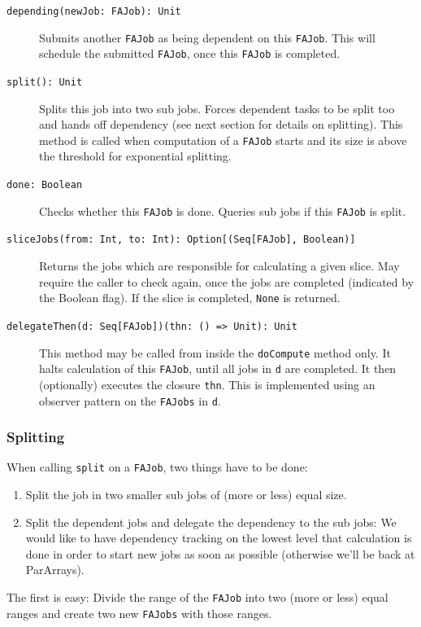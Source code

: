 \documentclass[runningheads,a4paper,fleqn]{llncs}
\begin{document}
\begin{description}
  \item[\texttt{depending(newJob: FAJob): Unit}] Submits another \texttt{FAJob} as being
    dependent on this \texttt{FAJob}. This will schedule the submitted
    \texttt{FAJob}, once this \texttt{FAJob} is completed.
  \item[\texttt{split(): Unit}] Splits this job into two
    sub jobs. Forces dependent tasks to be split too and hands off
    dependency (see next section for details on splitting). This
    method is called when computation of a \texttt{FAJob} starts and
    its size is above the threshold for exponential splitting.
  \item[\texttt{done: Boolean}] Checks whether this \texttt{FAJob} is
    done. Queries sub jobs if this \texttt{FAJob} is split.
  \item[\texttt{sliceJobs(from: Int, to: Int): Option[(Seq[FAJob],
      Boolean)]}] Returns the jobs which are responsible for
    calculating a given slice. May require the caller to check again,
    once the jobs are completed (indicated by the Boolean flag). If
    the slice is completed, \texttt{None} is returned.
  \item[\texttt{delegateThen(d: Seq[FAJob])(thn: () => Unit): Unit}]
    This method may be called from inside the \texttt{doCompute}
    method only. It halts calculation of this \texttt{FAJob}, until
    all jobs in \texttt{d} are completed. It then (optionally)
    executes the closure \texttt{thn}. This is implemented using an
    observer pattern on the \texttt{FAJobs} in \texttt{d}.
\end{description}

\subsubsection{Splitting}
When calling \texttt{split} on a \texttt{FAJob}, two things have to be
done:
\begin{enumerate}
\item Split the job in two smaller sub jobs of (more or less) equal
  size.
\item Split the dependent jobs and delegate the dependency to the
  sub jobs: We would like to have dependency tracking on the lowest
  level that calculation is done in order to start new jobs as soon as
  possible (otherwise we'll be back at ParArrays).
\end{enumerate}

The first is easy: Divide the range of the \texttt{FAJob} into two
(more or less) equal ranges and create two new \texttt{FAJobs} with
those ranges.
\end{document}
